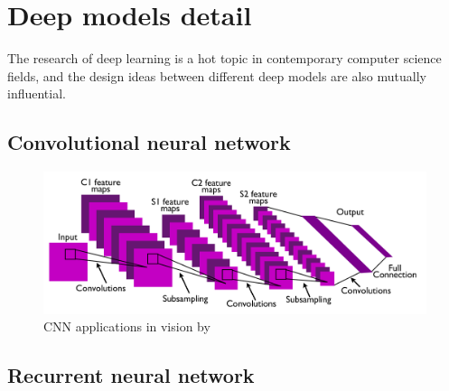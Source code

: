 \section{Deep models detail}
\label{sec:Deep models detail}
The research of deep learning is a hot topic in contemporary computer science fields, and the design ideas between different deep models are also mutually influential.
\subsection{Convolutional neural network}
\citet{fukushima1980neocognitron}

\citet{zhang1988shift}

\begin{figure}[ht!]
    \centering
    \includegraphics[width=\textwidth]{literature/imgs/ext-lecun-cnn-arch.png}
    \caption{CNN applications in vision by \citet{lecun2010convolutional}}
    \label{fig:ext-lecun-cnn-arch}
\end{figure}

\citet{lecun2010convolutional}

\citet{gu2018recent}

\subsection{Recurrent neural network}
\citet{jordan1997serial}

\citet{hochreiter1997long}

\citet{sherstinsky2020fundamentals}

